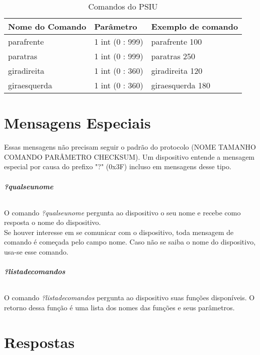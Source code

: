 \documentclass[11pt,a4paper]{article}
\begin{document}
\begin{table}[ht]
	\centering
	\caption{Comandos do PSIU}
	\begin{tabular}{p{4cm}p{3cm}p{5cm}}
		\toprule
		Nome do Comando &  Parâmetro & Exemplo de comando \\
		\midrule	
		parafrente & 1 int (0 : 999)  & parafrente 100 \\
		paratras & 1 int (0 : 999)  & paratras 250 \\
		giradireita & 1 int (0 : 360)  & giradireita 120 \\
		giraesquerda & 1 int (0 : 360)  & giraesquerda 180 \\
		\bottomrule
	\end{tabular}
	\label{tab:formatoslatex} %
\end{table}


\part*{Mensagens Especiais \newline}

Essas mensagens não precisam seguir o padrão do protocolo (NOME TAMANHO COMANDO PARÂMETRO CHECKSUM). Um dispositivo entende a mensagem especial por causa do prefixo "?" (0x3F) incluso em mensagens desse tipo.

\paragraph{\textbf{?qualseunome} \newline}
O comando \textit{?qualseunome} pergunta ao dispositivo o seu nome e recebe como resposta o nome do dispositivo. \\
Se houver interesse em se comunicar com o dispositivo, toda mensagem de comando é começada pelo campo nome. 
Caso não se saiba o nome do dispositivo, usa-se esse comando. \\


\paragraph{\textbf{?listadecomandos} \newline}
O comando \textit{?listadecomandos} pergunta ao dispositivo suas funções disponíveis. O retorno dessa função é uma lista dos nomes das funções e seus parâmetros.\\


\newpage
\part*{Respostas \newline}
\end{document}
